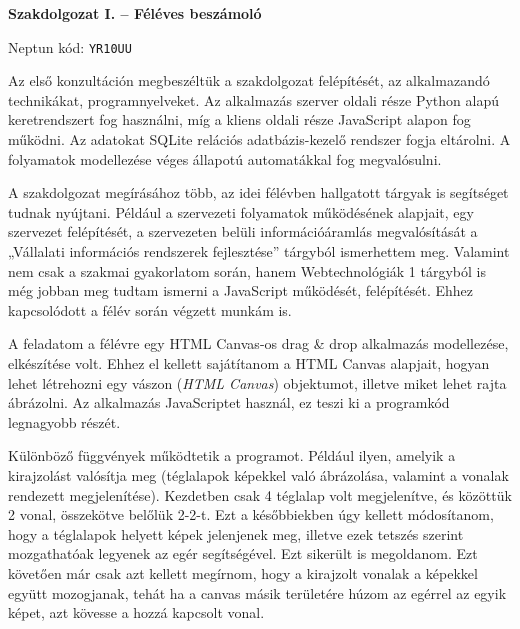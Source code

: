 \documentclass[a4paper]{article}
\begin{document}
\noindent \textbf{Szakdolgozat I. -- Féléves beszámoló}

\vskip 8mm


\vskip 4mm

\noindent Neptun kód: \texttt{YR10UU}

\vskip 1cm


Az első konzultáción megbeszéltük a szakdolgozat felépítését, az alkalmazandó technikákat, programnyelveket. Az alkalmazás szerver oldali része Python alapú keretrendszert fog használni, míg a kliens oldali része JavaScript alapon fog működni. Az adatokat SQLite relációs adatbázis-kezelő rendszer fogja eltárolni. A folyamatok modellezése véges állapotú automatákkal fog megvalósulni.

A szakdolgozat megírásához több, az idei félévben hallgatott tárgyak is segítséget tudnak nyújtani. Például a szervezeti folyamatok működésének alapjait, egy szervezet felépítését, a szervezeten belüli információáramlás megvalósítását a „Vállalati információs rendszerek fejlesztése” tárgyból ismerhettem meg. Valamint nem csak a szakmai gyakorlatom során, hanem Webtechnológiák 1 tárgyból is még jobban meg tudtam ismerni a JavaScript működését, felépítését. Ehhez kapcsolódott a félév során végzett munkám is.

A feladatom a félévre egy HTML Canvas-os drag \& drop alkalmazás modellezése, elkészítése volt. Ehhez el kellett sajátítanom a HTML Canvas alapjait, hogyan lehet létrehozni egy vászon (\textit{HTML Canvas}) objektumot, illetve miket lehet rajta ábrázolni. Az alkalmazás JavaScriptet használ, ez teszi ki a programkód legnagyobb részét.

Különböző függvények működtetik a programot. Például ilyen, amelyik a kirajzolást valósítja meg (téglalapok képekkel való ábrázolása, valamint a vonalak rendezett megjelenítése). Kezdetben csak 4 téglalap volt megjelenítve, és közöttük 2 vonal, összekötve belőlük 2-2-t. Ezt a későbbiekben úgy kellett módosítanom, hogy a téglalapok helyett képek jelenjenek meg, illetve ezek tetszés szerint mozgathatóak legyenek az egér segítségével. Ezt sikerült is megoldanom. Ezt követően már csak azt kellett megírnom, hogy a kirajzolt vonalak a képekkel együtt mozogjanak, tehát ha a canvas másik területére húzom az egérrel az egyik képet, azt kövesse a hozzá kapcsolt vonal.
\end{document}
